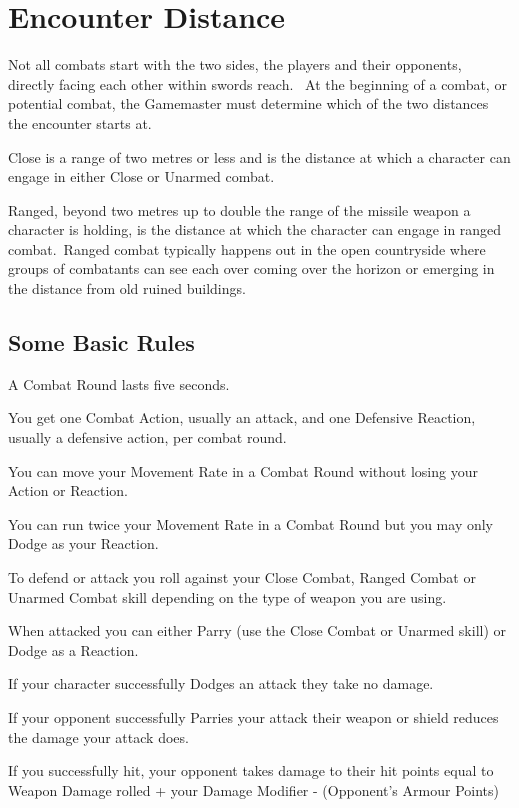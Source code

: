 \section{Encounter Distance}
Not all combats start with the two sides, the players and their opponents, directly facing each other within swords reach.  At the beginning of a combat, or potential combat, the Gamemaster must determine which of the two distances the encounter starts at.

Close is a range of two metres or less and is the distance at which a character can engage in either Close or Unarmed combat. 

Ranged, beyond two metres up to double the range of the missile weapon a character is holding, is the distance at which the character can engage in ranged combat. Ranged combat typically happens out in the open countryside where groups of combatants can see each over coming over the horizon or emerging in the distance from old ruined buildings.


\subsection{Some Basic Rules}
\begin{rpg-list}
\item A Combat Round lasts five seconds.

\item You get one Combat Action, usually an attack, and one Defensive Reaction, usually a defensive action, per combat round.

\item You can move your Movement Rate in a Combat Round without losing your Action or Reaction. 

\item You can run twice your Movement Rate in a Combat Round but you may only Dodge as your Reaction.

\item To defend or attack you roll against your Close Combat, Ranged Combat or Unarmed Combat skill depending on the type of weapon you are using.

\item When attacked you can either Parry (use the Close Combat or Unarmed skill) or Dodge as a Reaction.

\item If your character successfully Dodges an attack they take no damage.

\item If your opponent successfully Parries your attack their weapon or shield reduces the damage your attack does.

\item If you successfully hit, your opponent takes damage to their hit points equal to 
	Weapon Damage rolled + your Damage Modifier - (Opponent’s Armour Points)
\end{rpg-list}

